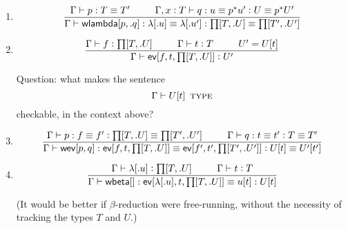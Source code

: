 \documentclass[11pt]{article}
\newcommand{\eqd}{\equiv}
\newcommand\spc{{\hskip 26pt}}
\newcommand{\ccolon}{\vcentcolon}
\newcommand{\ccheck}{\vcentcolon}            %
\newcommand{\csynth}{\vcentcolon\vcentcolon} %
\renewcommand{\csynth}{\ccheck}              %
\newcommand{\TYPE}{\mathop{\text{ \sc type}}}
\newcommand{\Okay}{\mathop{\text{ \sc okay}}}
\newcommand{\Context}{\vdash\Okay}
\renewcommand{\Context}{\vdash}
\newcommand{\ha}[2]{#1[#2]}
\newcommand{\annot}{{\sf annot}}
\newcommand{\haa}[2]{\ha\annot{#1,#2}}
\renewcommand{\haa}[2]{#1}
\newcommand{\conv}{{\sf conv}}
\newcommand{\ev}{{\sf ev}}
\newcommand{\wbeta}{{\sf wbeta}}
\newcommand{\weveq}{{\sf wev}}
\newcommand{\wlambda}{{\sf wlambda}}
\newcommand{\var}{\char`_}
\newcommand{\defn}{\vcentcolon\equiv}
\begin{document}
\begin{enumerate}
Here ${p}^*U'$ is notation for $U'[\haa {\ha\conv{x,T,p}} {T'}/x']$, where
$U'[e/x']$ is notation for replacing the leading variable $x'$ in $U'$ by the
expression $e$.

In the presence of $$\Gamma \vdash p:T \eqd T'  $$ it should be a
meta-theorem that $$\Gamma, x' \ccolon T' \vdash U' \TYPE $$ is
derivable if and only if $$\Gamma, x \ccolon T \vdash p^* U' \TYPE
$$ is derivable.  If not, we should add
$$  \Gamma, x' \ccolon T' \vdash U'  \TYPE  $$
as a premise to the rule above.

\item 
\[ \frac{ 
  \Gamma \vdash p:T \eqd T'  
  \spc
  \Gamma,  x \ccolon T \vdash q:u \eqd p^* u' \ccolon U \eqd p^*U'
  } {
  \Gamma \vdash \ha\wlambda{p,.q} : \ha\lambda{.u}\eqd \ha\lambda{.u'} : \ha\prod{T,.U} \eqd \ha\prod{T',.U'}
}\]

\item 
\[\frac{
  \Gamma \vdash f \ccheck{\ha\prod{T,.U}}
  \spc 
  \Gamma \vdash t \ccheck{T}
  \spc
  U' = U[\haa t T] 
}{
  \Gamma \vdash \ha \ev{f,t,{\ha\prod{T,.U}}} \csynth U'
}\]


Question: what makes the sentence $$\Gamma \vdash U[\haa t T] \TYPE $$
checkable, in the context above?

\item 
\[\frac{
   \Gamma \vdash p : f \eqd f' \ccolon {\ha\prod{T,.U}} \eqd {\ha\prod{T',.U'}} 
   \spc 
   \Gamma \vdash q : t \eqd t' \ccolon T \eqd T'
   }{
   \Gamma \vdash \ha\weveq{p,q} : \ha\ev{f,t,{\ha\prod{T,.U}}} \eqd \ha\ev{f',t',{\ha\prod{T',.U'}}} \ccolon U[\haa t T] \eqd U'[\haa {t'} {T'}]
  }\]

\item 
\[\frac{
  \Gamma \vdash \ha\lambda{.u} \ccheck {\ha\prod{T,.U}}
  \spc
  \Gamma \vdash t \ccheck{T} 
  }{
  \Gamma \vdash \ha\wbeta{} : \ha\ev{\ha\lambda{.u},t,{\ha\prod{T,.U}}} \eqd u[\haa{t}{T}] : U[\haa{t}{T}]
}\]


(It would be better if $\beta$-reduction were free-running, without the
necessity of tracking the types $T$ and $U$.)


\end{enumerate}
\end{document}
